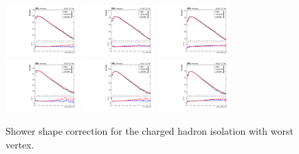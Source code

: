 \begin{figure}[htb]
	\centering
	\includegraphics[width=0.25\textwidth]{fig/ss_corr/phoPFChWorstIso_16_EB_Z.pdf}
	\includegraphics[width=0.25\textwidth]{fig/ss_corr/ph_chWorIso_17_EB_Z.pdf}
	\includegraphics[width=0.25\textwidth]{fig/ss_corr/phoPFChWorstIso_18_EB_Z.pdf}\\
	\includegraphics[width=0.25\textwidth]{fig/ss_corr/phoPFChWorstIso_16_EE_Z.pdf}
	\includegraphics[width=0.25\textwidth]{fig/ss_corr/ph_chWorIso_17_EE_Z.pdf}
	\includegraphics[width=0.25\textwidth]{fig/ss_corr/phoPFChWorstIso_18_EE_Z.pdf}\\	
	\label{fig:chwsiso_Z}
	\caption{Shower shape correction for the charged hadron isolation with worst vertex.}
\end{figure}
